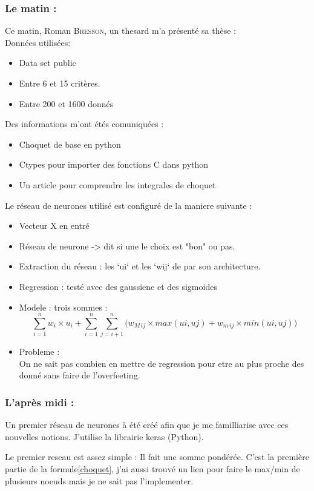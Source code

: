 ﻿\subsubsection*{Le matin :}
Ce matin, Roman \textsc{Bresson}, un thesard m'a présenté sa thèse : \\


Données utilisées:
\begin{itemize}
    \item Data set public
    \item Entre 6 et 15 critères.
    \item Entre 200 et 1600 donnés
\end{itemize}


Des informations m'ont étés comuniquées :
\begin{itemize}
    \item Choquet de base en python
    \item Ctypes pour importer des fonctions C dans python
    \item Un article pour comprendre les integrales de choquet \cite{grabisch2016fuzzy}
\end{itemize}


Le réseau de neurones utilisé est configuré de la maniere suivante :
\begin{itemize}
     \item Vecteur X en entré
     \item Réseau de neurone -> dit si une le choix est "bon" ou pas.
     \item Extraction du réseau : les `ui` et les `wij` de par son architecture.
     \item Regression : testé avec des gaussiene et des sigmoides
     \item Modele : trois sommes :
        \begin{equation}
            \label{choquet}
            \sum_{i=1}^{n}
                w_i \times u_i +
            \sum_{i=1}^{n}\sum_{j=i+1}^{n}
            \Big(
                w_{M\,ij} \times max(ui,uj) + w_{m\,ij} \times min(ui,uj)
            \Big)
        \end{equation}
    \item Probleme : \\
        On ne sait pas combien en mettre de regression pour etre au plus proche des donné sans faire de l'overfeeting.
\end{itemize}

\subsubsection*{L'après midi :}
Un premier réseau de neurones à été créé afin que je me familliarise avec ces nouvelles notions.
J'utilise la librairie keras\cite{keras} (Python).


Le premier reseau est assez simple : Il fait une somme pondérée.
C'est la première partie de la formule\ref{choquet}, j'ai aussi trouvé un lien pour faire le max/min de plusieurs
noeuds mais je ne sait pas l'implementer.
